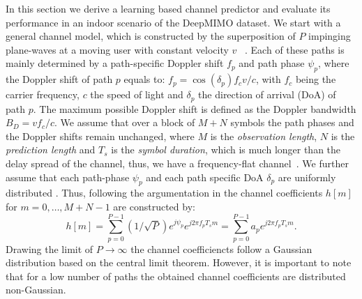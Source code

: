 \documentclass[12pt, draftclsnofoot, onecolumn]{IEEEtran}
\begin{document}
In this section we derive a learning based channel predictor and evaluate its performance in an indoor scenario of the DeepMIMO dataset. We start with a general channel model, which is constructed by the superposition of $P$ impinging plane-waves at a moving user with constant velocity $v$ ~\cite{Zemen,Clarke}. Each of these paths is mainly determined by a path-specific Doppler shift $f_p$ and path phase $\psi_p$, where the Doppler shift of path $p$ equals to: $f_p = \cos{(\delta_p)} {f_c v}/{c}$, with $f_c$ being the carrier frequency, $c$ the speed of light and $\delta_p$ the direction of arrival (DoA) of path $p$. The maximum possible Doppler shift is defined as the Doppler bandwidth $B_D = {v f_c}/ {c}$. We assume that over a block of $M+N$ symbols the path phases and the Doppler shifts remain unchanged, where $M$ is the \textit{observation length}, $N$ is the \textit{prediction length} and $T_s$ is the \textit{symbol duration}, which is much longer than the delay spread of the channel, thus, we have a frequency-flat channel~\cite{Zemen}. We further assume that each path-phase $\psi_p$ and each path specific DoA $\delta_p$ are uniformly distributed \cite{Zemen, Clarke}. Thus, following the argumentation in \cite{Zemen} the channel coefficients $h[m]$ for $m=0,\dots, M+N-1$ are constructed by:
\begin{equation}
    h[m] = \sum_{p=0}^{P-1} ({1}/{\sqrt{P}}) e^{j\psi_p} e^{j2\pi f_p T_s m} = \sum_{p=0}^{P-1} a_p e^{j2\pi f_p T_s m}.
    \label{channelcoeff}
\end{equation}
Drawing the limit of $P\to\infty$ the channel coefficiencts follow a Gaussian distribution based on the central limit theorem. However, it is important to note that for a low number of paths the obtained channel coefficients are distributed non-Gaussian.
\end{document}
